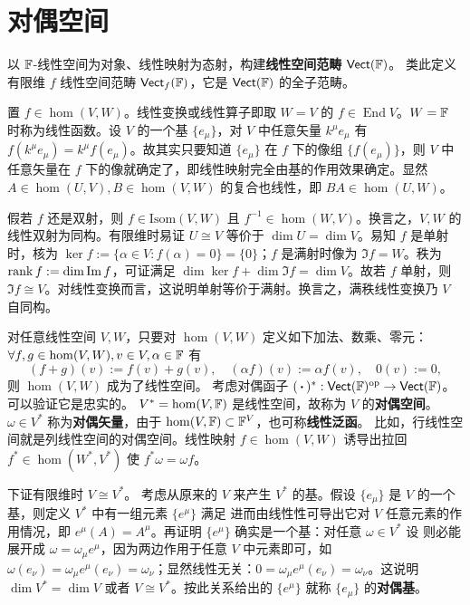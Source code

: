 \section{对偶空间}

以 $\mathbb{F}$-线性空间为对象、线性映射为态射，构建\textbf{线性空间范畴} $\mathsf{Vect}(\mathbb{F})$。
类此定义有限维 $f$ 线性空间范畴 $\mathsf{Vect}_f(\mathbb{F})$，它是 $\mathsf{Vect}(\mathbb{F})$ 的全子范畴。

置 $f\in\hom(V,W)$。线性变换或线性算子即取 $W=V$ 的 $f\in\operatorname{End} V$。$W=\mathbb{F}$ 时称为线性函数。设 $V$ 的一个基 $\{e_\mu\}$，对 $V$ 中任意矢量 $k^\mu e_\mu$ 有 $f(k^\mu e_\mu)=k^\mu f(e_\mu)$。故其实只要知道 $\{e_\mu\}$ 在 $f$ 下的像组 $\{f(e_\mu)\}$，则 $V$ 中任意矢量在 $f$ 下的像就确定了，即线性映射完全由基的作用效果确定。显然 $A\in\hom(U,V),B\in\hom(V,W)$ 的复合也线性，即 $BA\in\hom(U,W)$。

假若 $f$ 还是双射，则 $f\in\mathrm{Isom}(V, W)$ 且 $f^{-1}\in\hom(W,V)$。换言之，$V,W$ 的线性双射为同构。有限维时易证 $U\cong V$ 等价于 $\dim U=\dim V$。易知 $f$ 是单射时，核为 $\ker f:=\{\alpha\in V:f(\alpha)=0\}=\{0\}$；$f$ 是满射时像为 $\Im f=W$。秩为 $\rank f:=\dim \Im f$，可证满足 $\dim \ker f + \dim \Im f = \dim V$。故若 $f$ 单射，则 $\Im f\cong V$。对线性变换而言，这说明单射等价于满射。换言之，满秩线性变换乃 $V$ 自同构。

对任意线性空间 $V,W$，只要对 $\hom(V,W)$ 定义如下加法、数乘、零元：$\forall f,g\in \hom(V,W),v\in V,\alpha\in\mathbb{F}$ 有
\[(f+g)(v):=f(v)+g(v),\quad (\alpha f)(v):=\alpha f(v),\quad 0(v):=0,\]
则 $\hom(V,W)$ 成为了线性空间。
考虑对偶函子 $(\oo)^*:\cate{Vect}(\F)^\mathrm{op}\to \cate{Vect}(\F)$。
可以验证它是忠实的。
$V^*=\hom(V,\mathbb{F})$ 是线性空间，故称为 $V$ 的\textbf{对偶空间}。$\omega\in V^*$ 称为\textbf{对偶矢量}，由于 $\hom(V,\mathbb{F})\subset\mathbb{F}^V$，也可称\textbf{线性泛函}。
比如，行线性空间就是列线性空间的对偶空间。线性映射 $f\in\hom(V,W)$ 诱导出拉回 $f^*\in\hom(W^*, V^*)$ 使 $f^*\omega=\omega f$。

下证有限维时 $V\cong V^*$。
考虑从原来的 $V$ 来产生 $V^*$ 的基。假设 $\{e_\mu\}$ 是 $V$ 的一个基，则定义 $V^*$ 中有一组元素 $\{e^\mu\}$ 满足
进而由线性性可导出它对 $V$ 任意元素的作用情况，即 $e^\mu(A)=A^\mu$。再证明 $\{e^\mu\}$ 确实是一个基：对任意 $\omega\in V^*$ 设
则必能展开成 $\omega=\omega_\mu e^\mu$，因为两边作用于任意 $V$ 中元素即可，如 $\omega(e_\nu)=\omega_\mu e^\mu(e_\nu)=\omega_\nu$；显然线性无关：$0=\omega_\mu e^\mu(e_\nu)=\omega_\nu$。这说明 $\dim V^*=\dim V$ 或者 $V\cong V^*$。按此关系给出的 $\{e^\mu\}$ 就称 $\{e_\mu\}$ 的\textbf{对偶基}。

